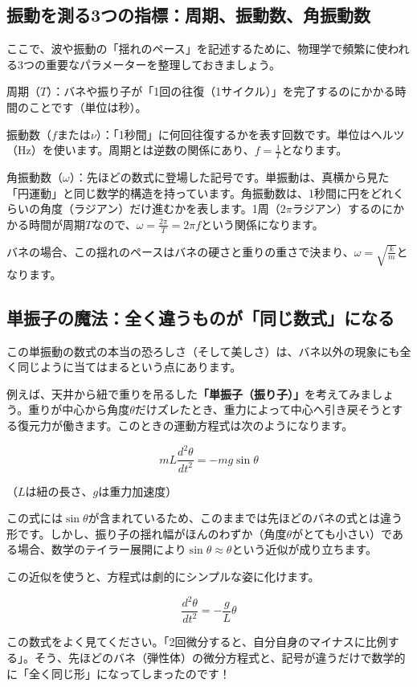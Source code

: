 \subsection{振動を測る3つの指標：周期、振動数、角振動数}

ここで、波や振動の「揺れのペース」を記述するために、物理学で頻繁に使われる3つの重要なパラメーターを整理しておきましょう。

周期（\(T\)）：バネや振り子が「1回の往復（1サイクル）」を完了するのにかかる時間のことです（単位は秒）。

振動数（\(f\)または\(\nu\)）：「1秒間」に何回往復するかを表す回数です。単位はヘルツ（Hz）を使います。周期とは逆数の関係にあり、\(f = \frac{1}{T}\)となります。

角振動数（\(\omega\)）：先ほどの数式に登場した記号です。単振動は、真横から見た「円運動」と同じ数学的構造を持っています。角振動数は、1秒間に円をどれくらいの角度（ラジアン）だけ進むかを表します。1周（\(2\pi\)ラジアン）するのにかかる時間が周期\(T\)なので、\(\omega = \frac{2\pi}{T} = 2\pi f\)という関係になります。

バネの場合、この揺れのペースはバネの硬さと重りの重さで決まり、\(\omega = \sqrt{\frac{k}{m}}\)となります。

\subsection{単振子の魔法：全く違うものが「同じ数式」になる}

この単振動の数式の本当の恐ろしさ（そして美しさ）は、バネ以外の現象にも全く同じように当てはまるという点にあります。

例えば、天井から紐で重りを吊るした\textbf{「単振子（振り子）」}を考えてみましょう。重りが中心から角度\(\theta\)だけズレたとき、重力によって中心へ引き戻そうとする復元力が働きます。このときの運動方程式は次のようになります。

\[mL \frac{d^2\theta}{dt^2} = -mg \sin\theta\]

（\(L\)は紐の長さ、\(g\)は重力加速度）

この式には\(\sin\theta\)が含まれているため、このままでは先ほどのバネの式とは違う形です。しかし、振り子の揺れ幅がほんのわずか（角度\(\theta\)がとても小さい）である場合、数学のテイラー展開により\(\sin\theta \approx \theta\)という近似が成り立ちます。

この近似を使うと、方程式は劇的にシンプルな姿に化けます。

\[\frac{d^2\theta}{dt^2} = -\frac{g}{L}\theta\]

この数式をよく見てください。「2回微分すると、自分自身のマイナスに比例する」。そう、先ほどのバネ（弾性体）の微分方程式と、記号が違うだけで数学的に「全く同じ形」になってしまったのです！

